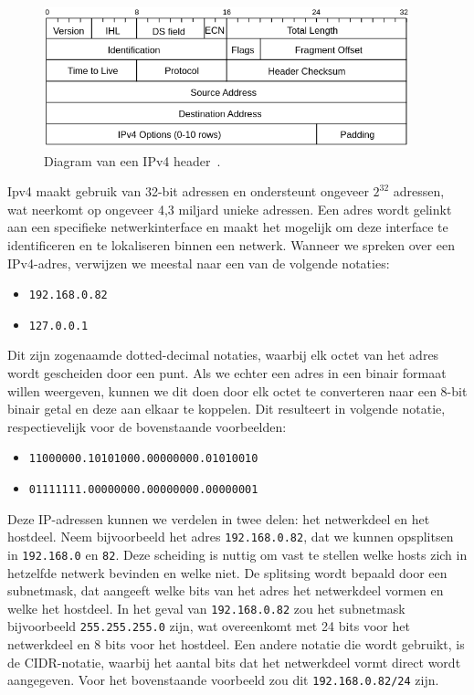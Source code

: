 \begin{figure}[h!]
    \begin{center}
        \includegraphics[width=300pt]
        {./graphics/network/ipv4-header.png}
        \caption{\label{fig:network-ipv4-header}Diagram van een IPv4 header~\autocite{dordal2020}.}
    \end{center}
\end{figure}

Ipv4 maakt gebruik van 32-bit adressen en ondersteunt ongeveer \(2^{32}\) adressen, wat neerkomt op ongeveer 4,3 miljard unieke adressen.
Een adres wordt gelinkt aan een specifieke netwerkinterface en maakt het mogelijk om deze interface te identificeren en te lokaliseren binnen een netwerk.
Wanneer we spreken over een IPv4-adres, verwijzen we meestal naar een van de volgende notaties:

\begin{itemize}
    \item \texttt{192.168.0.82}
    \item \texttt{127.0.0.1}
\end{itemize}

Dit zijn zogenaamde dotted-decimal notaties, waarbij elk octet van het adres wordt gescheiden door een punt.
Als we echter een adres in een binair formaat willen weergeven, kunnen we dit doen door elk octet te converteren naar een 8-bit binair getal en deze aan elkaar te koppelen.
Dit resulteert in volgende notatie, respectievelijk voor de bovenstaande voorbeelden:

\begin{itemize}
    \item \texttt{11000000.10101000.00000000.01010010}
    \item \texttt{01111111.00000000.00000000.00000001}
\end{itemize}

Deze IP-adressen kunnen we verdelen in twee delen: het netwerkdeel en het hostdeel.
Neem bijvoorbeeld het adres \texttt{192.168.0.82}, dat we kunnen opsplitsen in \texttt{192.168.0} en \texttt{82}.
Deze scheiding is nuttig om vast te stellen welke hosts zich in hetzelfde netwerk bevinden en welke niet.
De splitsing wordt bepaald door een subnetmask, dat aangeeft welke bits van het adres het netwerkdeel vormen en welke het hostdeel.
In het geval van \texttt{192.168.0.82} zou het subnetmask bijvoorbeeld \texttt{255.255.255.0} zijn, wat overeenkomt met 24 bits voor het netwerkdeel en 8 bits voor het hostdeel.
Een andere notatie die wordt gebruikt, is de CIDR-notatie, waarbij het aantal bits dat het netwerkdeel vormt direct wordt aangegeven.
Voor het bovenstaande voorbeeld zou dit \texttt{192.168.0.82/24} zijn.

